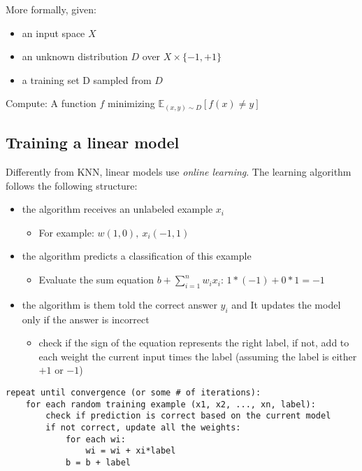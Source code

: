 \documentclass[11pt]{article}
\begin{document}
More formally, given:

\begin{itemize}
\tightlist
\item
  an input space \(X\)
\item
  an unknown distribution \(D\) over \(X \times \{ -1,+1 \}\)
\item
  a training set D sampled from \(D\)
\end{itemize}

Compute: A function \(f\) minimizing
\(\mathbb{E}_{(x, y)\sim D}[f(x) \ne  y]\)

\subsection{Training a linear model}\label{training-a-linear-model}

Differently from KNN, linear models use \emph{online learning}. The
learning algorithm follows the following structure:

\begin{itemize}
\tightlist
\item
  the algorithm receives an unlabeled example \(x_i\)

  \begin{itemize}
  \tightlist
  \item
    For example: \(w(1, 0),\ x_i(-1,1)\)
  \end{itemize}
\item
  the algorithm predicts a classification of this example

  \begin{itemize}
  \tightlist
  \item
    Evaluate the sum equation \(b+\sum_{i=1}^n w_ix_i\):
    \(1*(-1)+0*1 = -1\)
  \end{itemize}
\item
  the algorithm is them told the correct answer \(y_i\) and It updates
  the model only if the answer is incorrect

  \begin{itemize}
  \tightlist
  \item
    check if the sign of the equation represents the right label, if
    not, add to each weight the current input times the label (assuming
    the label is either \(+1\) or \(-1\))
  \end{itemize}
\end{itemize}

\begin{verbatim}
repeat until convergence (or some # of iterations):
    for each random training example (x1, x2, ..., xn, label):
        check if prediction is correct based on the current model
        if not correct, update all the weights:
            for each wi:
                wi = wi + xi*label
            b = b + label
\end{verbatim}
\end{document}
